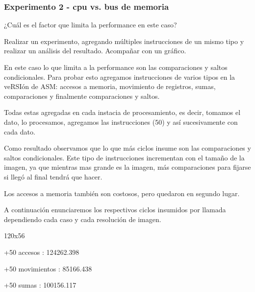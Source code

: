 \vspace*{0.3cm} \noindent
\subsubsection{Experimento 2 - cpu vs. bus de memoria}

	¿Cuál es el factor que limita la performance en este caso? 
	
	Realizar un experimento, agregando múltiples instrucciones de un mismo tipo
	y realizar un análisis 	del resultado. Acompañar con un gráfico.\vspace*{0.3cm} \noindent

  



  En este caso lo que limita a la performance son las comparaciones y saltos condicionales.
  Para probar esto agregamos instrucciones de varios tipos en la veRSIón de ASM: accesos a memoria, 
  movimiento de registros, sumas, comparaciones y finalmente comparaciones y saltos. \vspace*{0.2cm} \noindent




  Todas estas agregadas en cada instacia de procesamiento, es decir, tomamos el dato, lo procesamos,
  agregamos las instrucciones (50) y así sucesivamente con cada dato.\vspace*{0.2cm} \noindent




  Como resultado observamos que lo que más ciclos insume son las comparaciones y saltos condicionales. 
  Este tipo de instrucciones incrementan con el tamaño de la imagen, ya que mientras mas grande es la imagen, 
  más comparaciones para fijarse si llegó al final tendrá que hacer.\vspace*{0.2cm} \noindent




  Los accesos a memoria también son costosos, pero quedaron en segundo lugar.\vspace*{0.2cm} \noindent
  
  A continuación enunciaremos los respectivos ciclos insumidos por llamada dependiendo cada caso y cada 
  resolución de imagen.\vspace*{0.3cm} \noindent
 
 120x56 
 
+50 accesos		: 124262.398

+50 movimientos		: 85166.438

+50 sumas		: 100156.117


